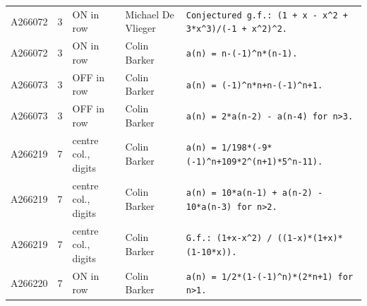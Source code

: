 \documentclass[11pt]{article}
\theoremstyle{definition}
\theoremstyle{remark}
\begin{document}
{\begin{longtable}{p{1.3cm}p{0.7cm}p{2.4cm}p{2.3cm}p{7.3cm}}
A266072 & 3 & ON in row & Michael De Vlieger & \texttt{Conjectured \allowbreak{}g.f.: \allowbreak{}(1 \allowbreak{}+\allowbreak{} \allowbreak{}x \allowbreak{}-\allowbreak{} \allowbreak{}x\^{}2 \allowbreak{}+\allowbreak{} \allowbreak{}3*\allowbreak{}x\^{}3)\allowbreak{}/\allowbreak{}(-\allowbreak{}1 \allowbreak{}+\allowbreak{} \allowbreak{}x\^{}2)\allowbreak{}\^{}2.} \\
A266072 & 3 & ON in row & Colin Barker & \texttt{a(n)\allowbreak{} \allowbreak{}=\allowbreak{} \allowbreak{}n-\allowbreak{}(-\allowbreak{}1)\allowbreak{}\^{}n*\allowbreak{}(n-\allowbreak{}1)\allowbreak{}.} \\
A266073 & 3 & OFF in row & Colin Barker & \texttt{a(n)\allowbreak{} \allowbreak{}=\allowbreak{} \allowbreak{}(-\allowbreak{}1)\allowbreak{}\^{}n*\allowbreak{}n+\allowbreak{}n-\allowbreak{}(-\allowbreak{}1)\allowbreak{}\^{}n+\allowbreak{}1.} \\
A266073 & 3 & OFF in row & Colin Barker & \texttt{a(n)\allowbreak{} \allowbreak{}=\allowbreak{} \allowbreak{}2*\allowbreak{}a(n-\allowbreak{}2)\allowbreak{} \allowbreak{}-\allowbreak{} \allowbreak{}a(n-\allowbreak{}4)\allowbreak{} \allowbreak{}for \allowbreak{}n>3.} \\
A266219 & 7 & centre col., digits & Colin Barker & \texttt{a(n)\allowbreak{} \allowbreak{}=\allowbreak{} \allowbreak{}1/\allowbreak{}198*\allowbreak{}(-\allowbreak{}9*\allowbreak{}(-\allowbreak{}1)\allowbreak{}\^{}n+\allowbreak{}109*\allowbreak{}2\^{}(n+\allowbreak{}1)\allowbreak{}*\allowbreak{}5\^{}n-\allowbreak{}11)\allowbreak{}.} \\
A266219 & 7 & centre col., digits & Colin Barker & \texttt{a(n)\allowbreak{} \allowbreak{}=\allowbreak{} \allowbreak{}10*\allowbreak{}a(n-\allowbreak{}1)\allowbreak{} \allowbreak{}+\allowbreak{} \allowbreak{}a(n-\allowbreak{}2)\allowbreak{} \allowbreak{}-\allowbreak{} \allowbreak{}10*\allowbreak{}a(n-\allowbreak{}3)\allowbreak{} \allowbreak{}for \allowbreak{}n>2.} \\
A266219 & 7 & centre col., digits & Colin Barker & \texttt{G.f.: \allowbreak{}(1+\allowbreak{}x-\allowbreak{}x\^{}2)\allowbreak{} \allowbreak{}/\allowbreak{} \allowbreak{}((1-\allowbreak{}x)\allowbreak{}*\allowbreak{}(1+\allowbreak{}x)\allowbreak{}*\allowbreak{}(1-\allowbreak{}10*\allowbreak{}x)\allowbreak{})\allowbreak{}.} \\
A266220 & 7 & ON in row & Colin Barker & \texttt{a(n)\allowbreak{} \allowbreak{}=\allowbreak{} \allowbreak{}1/\allowbreak{}2*\allowbreak{}(1-\allowbreak{}(-\allowbreak{}1)\allowbreak{}\^{}n)\allowbreak{}*\allowbreak{}(2*\allowbreak{}n+\allowbreak{}1)\allowbreak{} \allowbreak{}for \allowbreak{}n>1.} \\

\end{longtable}}
\end{document}
